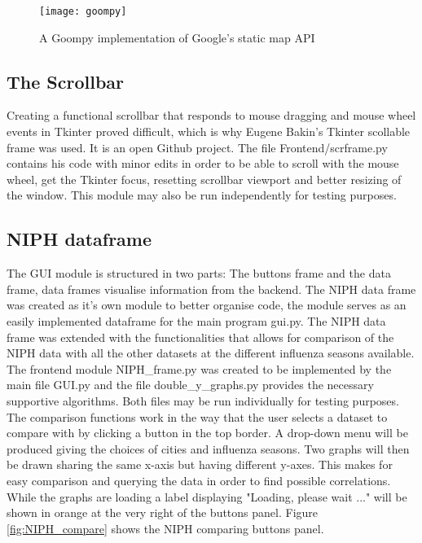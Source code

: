 \begin{figure}[!htb]
\texttt{[image: goompy]}
\centering
\caption{A Goompy implementation of Google's static map API}
\label{fig:the_goompy}
\end{figure}

\newpage














\subsection{The Scrollbar}
Creating a functional scrollbar that responds to mouse dragging and mouse wheel events in Tkinter proved difficult, which is why Eugene Bakin's Tkinter scollable\cite{scrframe} frame was used. It is an open Github project. The file Frontend/scrframe.py contains his code with minor edits in order to be able to scroll with the mouse wheel, get the Tkinter focus, resetting scrollbar viewport and better resizing of the window. This module may also be run independently for testing purposes.




\subsection{NIPH dataframe}
The GUI module is structured in two parts: The buttons frame and the data frame, data frames visualise information from the backend. The NIPH data frame was created as it's own module to better organise code, the module serves as an easily implemented dataframe for the main program gui.py. The NIPH data frame was extended with the functionalities that allows for comparison of the NIPH data with all the other datasets at the different influenza seasons available. The frontend module NIPH\_frame.py was created to be implemented by the main file GUI.py and the file double\_y\_graphs.py provides the necessary supportive algorithms. Both files may be run individually for testing purposes. The comparison functions work in the way that the user selects a dataset to compare with by clicking a button in the top border. A drop-down menu will be produced giving the choices of cities and influenza seasons. Two graphs will then be drawn sharing the same x-axis but having different y-axes. This makes for easy comparison and querying the data in order to find possible correlations. While the graphs are loading a label displaying "Loading, please wait ..." will be shown in orange at the very right of the buttons panel. Figure \ref{fig:NIPH_compare} shows the NIPH comparing buttons panel.

